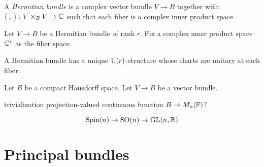 \documentclass{../../large}
\begin{document}
\begin{prb}
A \emph{Hermitian bundle} is a complex vector bundle $V\to B$ together with $\langle\cdot,\cdot\rangle:V\times_BV\to\mathbb{C}$ such that each fiber is a complex inner product space.

Let $V\to B$ be a Hermitian bundle of rank $r$.
Fix a complex inner product space $\mathbb{C}^r$ as the fiber space.
\begin{parts}
\item A Hermitian bundle has a unique $\mathrm{U}(r)$-structure whose charts are unitary at each fiber.
\end{parts}
\end{prb}


\begin{prb}
\end{prb}
\begin{pf}
Let $B$ be a compact Hausdorff space.
Let $V\to B$ be a vector bundle.

trivialization
projection-valued continuous function $B\to M_n(\mathbb{F})$?
\end{pf}

\[\mathrm{Spin}(n)\to\mathrm{SO}(n)\to\mathrm{GL}(n,\mathbb{R})\]




\section{Principal bundles}
\end{document}
